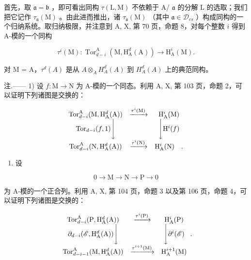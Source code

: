 首先，取 \(\mathfrak{a} = \mathfrak{b}\) ，即可看出同构 \(\tau(\mathrm{L},\mathrm{M})\) 不依赖于 A/ \(\mathfrak{a}\) 的分解 L 的选取；我们把它记作 \(\tau_{\mathfrak{a}}(\mathrm{M})\) 。由此进而推出，诸 \(\tau_{\mathfrak{a}}(\mathrm{M})\) （其中 \(\mathfrak{a} \in \mathcal{D}_{cs}\) ）构成同构的一个归纳系统。取归纳极限，并注意到 A, X, 第 70 页，命题 8，对每个整数 \(i\) 得到 A-模的一个同构

\[
\tau^ {i} (\mathrm{M}): \operatorname{Tor} _ {d - i} ^ {\mathrm{A}} (\mathrm{M}, \mathrm{H} _ {\mathrm{A}} ^ {d} (\mathrm{A})) \longrightarrow \mathrm{H} _ {\mathrm{A}} ^ {i} (\mathrm{M}).
\]

对 M = A，\(\tau^{d}(A)\) 是从 \(A \otimes_{A} H_{A}^{d}(A)\) 到 \(H_{A}^{d}(A)\) 上的典范同构。

注.—— 1) 设 \(f: \mathrm{M} \to \mathrm{N}\) 为 A-模的一个同态。利用 A, X, 第 103 页，命题 2，可以证明下列诸图是交换的：

\[
\begin{array}{c c c} \operatorname{Tor} _ {d - i} ^ {\mathrm{A}} (\mathrm{M}, \mathrm{H} _ {\mathrm{A}} ^ {d} (\mathrm{A})) & \xrightarrow {\tau^ {i} (\mathrm{M})} & \mathrm{H} _ {\mathrm{A}} ^ {i} (\mathrm{M}) \\ \operatorname{Tor} _ {d - i} (f, 1) \Bigg \downarrow & & \Bigg \downarrow \mathrm{H} ^ {i} (f) \\ \operatorname{Tor} _ {d - i} ^ {\mathrm{A}} (\mathrm{N}, \mathrm{H} _ {\mathrm{A}} ^ {d} (\mathrm{A})) & \xrightarrow {\tau^ {i} (\mathrm{N})} & \mathrm{H} _ {\mathrm{A}} ^ {i} (\mathrm{N}) \quad . \end{array}
\]

\begin{enumerate}
\def\labelenumi{\arabic{enumi})}
\setcounter{enumi}{1}
\tightlist
\item
  设
\end{enumerate}

\[
0 \to \mathrm{M} \to \mathrm{N} \to \mathrm{P} \to 0\tag{ℰ}
\]

为 A-模的一个正合列。利用 A, X, 第 104 页，命题 3 以及第 106 页，命题 4，可以证明下列诸图是交换的：

\[
\begin{array}{c c c} \operatorname{Tor} _ {d - i} ^ {\mathrm{A}} (\mathrm{P}, \mathrm{H} _ {\mathrm{A}} ^ {d} (\mathrm{A})) & \xrightarrow {\tau^ {i} (\mathrm{P})} & \mathrm{H} _ {\mathrm{A}} ^ {i} (\mathrm{P}) \\ \partial_ {d - i} (\mathscr {E}, \mathrm{H} _ {\mathrm{A}} ^ {d} (\mathrm{A})) \Bigg \downarrow & & \Bigg \downarrow \partial^ {i} (\mathscr {E}) \\ \operatorname{Tor} _ {d - i - 1} ^ {\mathrm{A}} (\mathrm{M}, \mathrm{H} _ {\mathrm{A}} ^ {d} (\mathrm{A})) & \xrightarrow {\tau^ {i + 1} (\mathrm{M})} & \mathrm{H} _ {\mathrm{A}} ^ {i + 1} (\mathrm{M}) \end{array} .
\]

